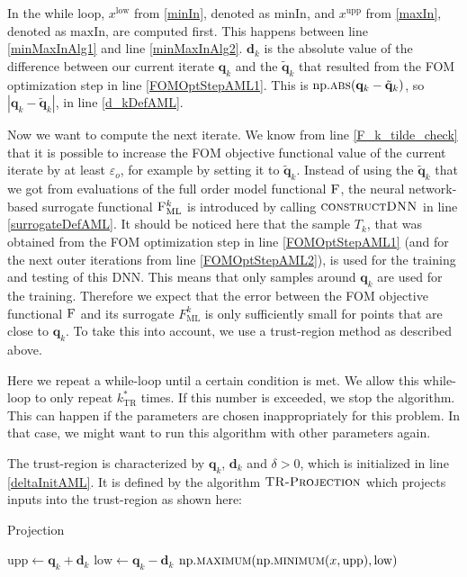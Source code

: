 In the while loop, $x^\mathrm{low}$ from \eqref{minIn}, denoted as $\mathrm{minIn}$, and $x^\mathrm{upp}$ from \eqref{maxIn}, denoted as $\mathrm{maxIn}$, are computed first. This happens between line \ref{minMaxInAlg1} and line \ref{minMaxInAlg2}. $\mathbf{d}_k$ is the absolute value of the difference between our current iterate $\mathbf{q}_k$ and the $\tilde{\mathbf{q}}_k$ that resulted from the FOM optimization step in line \ref{FOMOptStepAML1}. This is $\mathrm{np.}\Call{abs}{\mathbf{q}_k-\tilde{\mathbf{q}}_k}$, so $|\mathbf{q}_k-\tilde{\mathbf{q}}_k|$, in line \ref{d_kDefAML}.

Now we want to compute the next iterate. We know from line \ref{F_k_tilde_check} that it is possible to increase the FOM objective functional value of the current iterate by at least $\varepsilon_o$, for example by setting it to $\tilde{\mathbf{q}}_k$. Instead of using the $\tilde{\mathbf{q}}_k$ that we got from evaluations of the full order model functional $\textproc{F}$, the neural network-based surrogate functional $\textproc{F$_\mathrm{ML}^k$}$ is introduced by calling $\textproc{constructDNN}$ in line \ref{surrogateDefAML}. It should be noticed here that the sample $T_k$, that was obtained from the FOM optimization step in line \ref{FOMOptStepAML1} (and for the next outer iterations from line \ref{FOMOptStepAML2}), is used for the training and testing of this DNN. This means that only samples around $\mathbf{q}_k$ are used for the training. Therefore we expect that the error between the FOM objective functional $\textproc{F}$ and its surrogate $F_\mathrm{ML}^k$ is only sufficiently small for points that are close to $\mathbf{q}_k$. To take this into account, we use a trust-region method as described above.

Here we repeat a while-loop until a certain condition is met. We allow this while-loop to only repeat $k^*_\mathrm{TR}$ times. If this number is exceeded, we stop the algorithm. This can happen if the parameters are chosen inappropriately for this problem. In that case, we might want to run this algorithm with other parameters again.

The trust-region is characterized by $\mathbf{q}_k$, $\mathbf{d}_k$ and $\delta>0$, which is initialized in line \ref{deltaInitAML}. It is defined by the algorithm $\textproc{TR-Projection}$ which projects inputs into the trust-region as shown here:
 
 \begin{algorithm}[H]%
\caption{\label{projectionAlg}Projection}
\begin{algorithmic}[1]
\State $\mathrm{upp}\gets\mathbf{q}_k+\mathbf{d}_k$
\State $\mathrm{low}\gets\mathbf{q}_k-\mathbf{d}_k$
\State \Return $\mathrm{np.}\Call{maximum}{\mathrm{np.}\protect\Call{minimum}{x,\mathrm{upp}},\mathrm{low}}$
\EndFunction
\end{algorithmic}
\end{algorithm}

